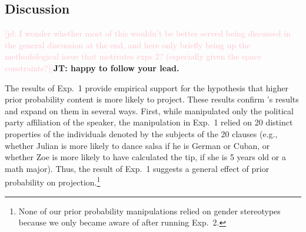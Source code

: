 \documentclass[11pt,fleqn]{article}
\newcommand{\jd}[1]{\textcolor{Pink}{[jd: #1]}}
\newcommand{\jt}[1]{\textbf{\color{blue}JT: #1}}
\newcommand{\6}{\mbox{$[\hspace*{-.6mm}[$}}
\newcommand{\9}{\mbox{$]\hspace*{-.6mm}]$}}
\newcommand{\citepos}[1]{\citeauthor{#1}'s \citeyear{#1}}
\begin{document}
%
%
%

\subsection{Discussion}

\jd{I wonder whether most of this wouldn't be better served being discussed in the general discussion at the end, and here only briefly bring up the methodological issue that motivates exps 2? (especially given the space constraints?)}\jt{happy to follow your lead.}

The results of Exp.~1 provide empirical support for the hypothesis that higher prior probability content is more likely to project. These results confirm \citepos{mahler2020} results and expand on them in several ways. First, while  manipulated only the political party affiliation of the speaker, the manipulation in Exp.~1 relied on 20 distinct properties of the individuals denoted by the subjects of the 20 clauses (e.g., whether Julian is more likely to dance salsa if he is German or Cuban, or whether Zoe is more likely to have calculated the tip, if she is 5 years old or a math major). Thus, the result of Exp.~1 suggests a general effect of prior probability on projection.\footnote{None of our prior probability manipulations relied on gender stereotypes because we only became aware of  after running Exp.~2.}
\end{document}
